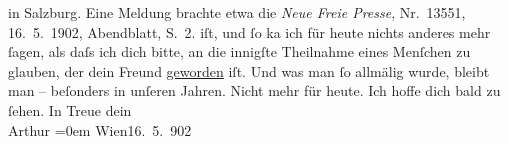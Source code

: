 \begin{ledgroupsized}[t]{13cm}
{{{                  in Salzburg. Eine Meldung brachte etwa die \emph{Neue Freie Presse}, Nr. 13551,
                        16. 5. 1902, Abendblatt, S. 2.}}}\label{K_L01220-1h} iſt, und ſo ka{\geminationn} ich für heute nichts anderes mehr ſagen, als daſs ich
               dich bitte, an die innigſte {\pb}Theilnahme eines
               Menſchen zu glauben, der dein Freund \uline{geworden} iſt.
               Und was man ſo allmälig wurde, bleibt man – beſonders in unſeren Jahren. Nicht mehr
               für heute. Ich hoffe dich bald zu ſehen.\pend
           \pstart
           In Treue dein{\\[\baselineskip]}\spacefill\mbox{Arthur}\pend
           \leftskip=0em{}\pstart
           Wien16. 5. 902\pend
           
         
         \endnumbering{}\end{ledgroupsized}  \newcommand{\dateiname}{L01220}\newcommand{\titel}{Arthur Schnitzler an Hermann Bahr, 16. 5. 1902}\newcommand{\editorInnen}{ Kurt Ifkovits,  Martin Anton Müller}
      